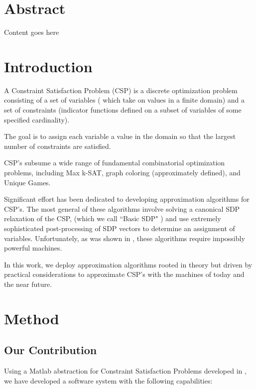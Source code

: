 \documentclass[11pt]{article} %
\begin{document}
\section*{Abstract}

Content goes here

\section{Introduction}

A Constraint Satisfaction Problem (CSP) is a discrete optimization problem consisting of a set of variables ( which take on values in a finite domain) and a set of constraints (indicator functions defined on a subset of variables of some specified cardinality).

The goal is to assign each variable a value in the domain so that the largest number of constraints are satisfied.

CSP's subsume a wide range of fundamental combinatorial optimization problems, including Max k-SAT, graph coloring (approximately defined), and Unique Games.

Significant effort has been dedicated to developing approximation algorithms for CSP's. The most general of these algorithms involve solving a canonical SDP relaxation of the CSP, (which we call ``Basic SDP" \citep{raghavendra2008optimal}) and use extremely sophisticated post-processing of SDP vectors to determine an assignment of variables. Unfortunately, as was shown in \cite{qwivedi2015introduction}, these algorithms require impossibly powerful machines.

In this work, we deploy approximation algorithms rooted in theory but driven by practical considerations to approximate CSP's with the machines of today and the near future.

\section{Method}

\subsection{Our Contribution}

Using a Matlab abstraction for Constraint Satisfaction Problems developed in \citet{qwivedi2015introduction}, we have developed a software system with the following capabilities:
\end{document}
